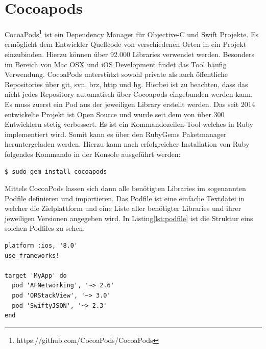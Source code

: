     \section{Cocoapods}\label{sec:cocoapods}
    CocoaPods\footnote{https://github.com/CocoaPods/CocoaPods} ist ein Dependency Manager für Objective-C und Swift Projekte.
    Es ermöglicht dem Entwickler Quellcode von verschiedenen Orten in ein Projekt einzubinden.
    Hierzu können über 92.000 Libraries verwendet werden.
    Besonders im Bereich von Mac OSX und iOS Development findet das Tool häufig Verwendung.
    CocoaPods unterstützt sowohl private als auch öffentliche Repositories über git, svn, brz, http und hg.
    Hierbei ist zu beachten, dass das nicht jedes Repository automatisch über Cocoapods eingebunden werden kann.
    Es muss zuerst ein Pod aus der jeweiligen Library erstellt werden.
    Das seit 2014 entwickelte Projekt ist Open Source und wurde seit dem von über 300 Entwicklern stetig verbessert.
    Es ist ein Kommandozeilen-Tool welches in Ruby implementiert wird.
    Somit kann es über den RubyGems Paketmanager heruntergeladen werden.
    Hierzu kann nach erfolgreicher Installation von Ruby folgendes Kommando in der Konsole ausgeführt werden:
    \begin{lstlisting}[language=bash,label={lst:cocoapods}]
        $ sudo gem install cocoapods
    \end{lstlisting}
    Mittels CocoaPods lassen sich dann alle benötigten Libraries im sogenannten Podfile definieren und importieren.
    Das Podfile ist eine einfache Textdatei in welcher die Zielplattform und eine Liste aller benötigter Libraries und ihrer jeweiligen Versionen angegeben wird.
    In Listing\ref{lst:podfile} ist die Struktur eins solchen Podfiles zu sehen.
    ~\cite{cocoapods1, cocoapods2, cocoapods3}
    \begin{lstlisting}[language={},firstnumber=1,label={lst:podfile},caption={Beispielstuktur eines Podfiles},captionpos=t]
platform :ios, '8.0'
use_frameworks!

target 'MyApp' do
  pod 'AFNetworking', '~> 2.6'
  pod 'ORStackView', '~> 3.0'
  pod 'SwiftyJSON', '~> 2.3'
end
    \end{lstlisting}


